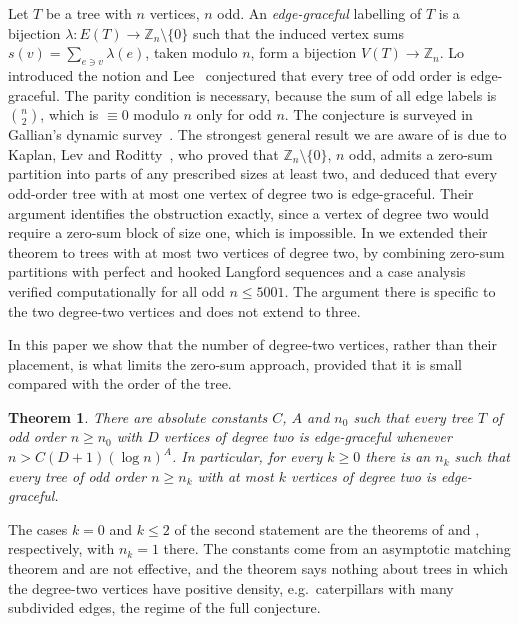 \documentclass[11pt,a4paper]{article}
\theoremstyle{plain}
\newtheorem{theorem}{Theorem}[section]
\theoremstyle{definition}
\theoremstyle{remark}
\newcommand{\Z}{\mathbb{Z}}
\begin{document}
Let $T$ be a tree with $n$ vertices, $n$ odd.  An \emph{edge-graceful}
labelling of $T$ is a bijection $\lambda\colon E(T)\to\Z_n\setminus\{0\}$
such that the induced vertex sums $s(v)=\sum_{e\ni v}\lambda(e)$, taken modulo
$n$, form a bijection $V(T)\to\Z_n$.  Lo~\cite{Lo1985} introduced the notion
and Lee~\cite{Lee1989} conjectured that every tree of odd order is
edge-graceful.  The parity condition is necessary, because the sum of all
edge labels is $\binom{n}{2}$, which is $\equiv 0$ modulo $n$ only for odd
$n$.  The conjecture is surveyed
in Gallian's dynamic survey~\cite{GallianDS6}.  The strongest general result
we are aware of is due to Kaplan, Lev and Roditty~\cite{KaplanLevRoditty2009},
who proved that $\Z_n\setminus\{0\}$, $n$ odd, admits a zero-sum partition into
parts of any prescribed sizes at least two, and deduced that every odd-order
tree with at most one vertex of degree two is edge-graceful.  Their argument
identifies the obstruction exactly, since a vertex of degree two would require
a zero-sum block of size one, which is impossible.  In \cite{Meng2026two} we
extended their theorem to trees with at most two vertices of degree two, by
combining zero-sum partitions with perfect and hooked Langford sequences and
a case analysis verified computationally for all odd $n\le 5001$.  The
argument there is specific to the two degree-two vertices and does not
extend to three.

In this paper we show that the number of degree-two vertices, rather than
their placement, is what limits the zero-sum approach, provided that it is
small compared with the order of the tree.

\begin{theorem}\label{thm:main}
There are absolute constants $C$, $A$ and $n_0$ such that every tree $T$ of
odd order $n\ge n_0$ with $D$ vertices of degree two is edge-graceful whenever
$n>C(D+1)(\log n)^{A}$.  In particular, for every $k\ge 0$ there is an $n_k$
such that every tree of odd order $n\ge n_k$ with at most $k$ vertices of
degree two is edge-graceful.
\end{theorem}

The cases $k=0$ and $k\le2$ of the second statement are the theorems of
\cite{KaplanLevRoditty2009} and \cite{Meng2026two}, respectively, with
$n_k=1$ there.  The constants come from an asymptotic matching theorem and
are not effective, and the theorem says nothing about trees in which the
degree-two vertices have positive density, e.g.\ caterpillars with many
subdivided edges, the regime of the full conjecture.
\end{document}
